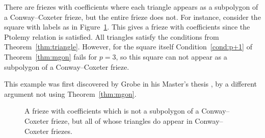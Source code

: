 \documentclass[ALCO,ThmDefs,Unicode,epreuves,published]{cedram}
\numberwithin{equation}{section}
\begin{document}
\begin{exam} \label{ex:grobe}
There are friezes with coefficients where each triangle appears 
as a subpolygon of a Conway--Coxeter frieze, but the entire frieze does not.
For instance, consider the square with labels as 
in Figure~\ref{fig:exsquare}. 
This gives a frieze with coefficients since the Ptolemy relation is satisfied.
All triangles satisfy the conditions from Theorem~\ref{thm:triangle}. However,
for the square itself Condition~\eqref{cond:p+1} of Theorem~\ref{thm:mgon}
fails for $p=3$, so this square can not appear as a subpolygon of a 
Conway--Coxeter frieze. 

This example was first discovered by Grobe in his Master's thesis 
\cite{Grobe}, by a different argument not using Theorem~\ref{thm:mgon}. 

\begin{figure}[htb]\centering
{}
 \caption{A frieze with coefficients which is not a subpolygon of a 
 Conway--Coxeter frieze, but all of whose triangles do appear in
 Conway--Coxeter friezes. 
 \label{fig:exsquare}}
\end{figure}
\end{exam}
\end{document}
